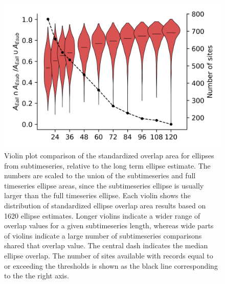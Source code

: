 \documentclass[draft, linenumbers]{agujournal2018}
\begin{document}
\FloatBarrier
\begin{figure}
\includegraphics[width = 4.5in]{Figs/Fig1.png}
\caption{Violin plot comparison of the standardized overlap area for ellipses from subtimeseries, relative to the long term ellipse estimate. The numbers are scaled to the union of the subtimeseries and full timeseries ellipse areas, since the subtimeseries ellipse is usually larger than the full timeseries ellipse. Each violin shows the distribution of standardized ellipse overlap area results based on 1620 ellipse estimates. Longer violins indicate a wider range of overlap values for a given subtimeseries length, whereas wide parts of violins indicate a large number of subtimeseries comparisons shared that overlap value. The central dash indicates the median ellipse overlap. The number of sites available with records equal to or exceeding the thresholds is shown as the black line corresponding to the the right axis. }
\label{fig:ellipse}
\end{figure}
\end{document}
